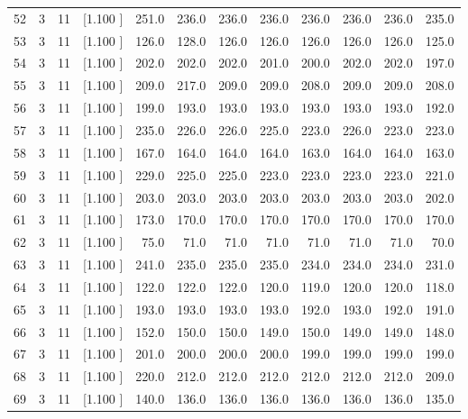 \documentclass[12pt,a4paper]{article}
\begin{document}
\begin{center}
{\begin{tabular}{r r r r r r r r r r r r}
  52&  3& 11&[1.100     ]&   251.0&   236.0&   236.0&   236.0&   236.0&   236.0&   236.0&   235.0\\[-0.02in]
  53&  3& 11&[1.100     ]&   126.0&   128.0&   126.0&   126.0&   126.0&   126.0&   126.0&   125.0\\[-0.02in]
  54&  3& 11&[1.100     ]&   202.0&   202.0&   202.0&   201.0&   200.0&   202.0&   202.0&   197.0\\[-0.02in]
  55&  3& 11&[1.100     ]&   209.0&   217.0&   209.0&   209.0&   208.0&   209.0&   209.0&   208.0\\[-0.02in]
  56&  3& 11&[1.100     ]&   199.0&   193.0&   193.0&   193.0&   193.0&   193.0&   193.0&   192.0\\[-0.02in]
  57&  3& 11&[1.100     ]&   235.0&   226.0&   226.0&   225.0&   223.0&   226.0&   223.0&   223.0\\[-0.02in]
  58&  3& 11&[1.100     ]&   167.0&   164.0&   164.0&   164.0&   163.0&   164.0&   164.0&   163.0\\[-0.02in]
  59&  3& 11&[1.100     ]&   229.0&   225.0&   225.0&   223.0&   223.0&   223.0&   223.0&   221.0\\[-0.02in]
  60&  3& 11&[1.100     ]&   203.0&   203.0&   203.0&   203.0&   203.0&   203.0&   203.0&   202.0\\[-0.02in]
  61&  3& 11&[1.100     ]&   173.0&   170.0&   170.0&   170.0&   170.0&   170.0&   170.0&   170.0\\[-0.02in]
  62&  3& 11&[1.100     ]&    75.0&    71.0&    71.0&    71.0&    71.0&    71.0&    71.0&    70.0\\[-0.02in]
  63&  3& 11&[1.100     ]&   241.0&   235.0&   235.0&   235.0&   234.0&   234.0&   234.0&   231.0\\[-0.02in]
  64&  3& 11&[1.100     ]&   122.0&   122.0&   122.0&   120.0&   119.0&   120.0&   120.0&   118.0\\[-0.02in]
  65&  3& 11&[1.100     ]&   193.0&   193.0&   193.0&   193.0&   192.0&   193.0&   192.0&   191.0\\[-0.02in]
  66&  3& 11&[1.100     ]&   152.0&   150.0&   150.0&   149.0&   150.0&   149.0&   149.0&   148.0\\[-0.02in]
  67&  3& 11&[1.100     ]&   201.0&   200.0&   200.0&   200.0&   199.0&   199.0&   199.0&   199.0\\[-0.02in]
  68&  3& 11&[1.100     ]&   220.0&   212.0&   212.0&   212.0&   212.0&   212.0&   212.0&   209.0\\[-0.02in]
  69&  3& 11&[1.100     ]&   140.0&   136.0&   136.0&   136.0&   136.0&   136.0&   136.0&   135.0\\[-0.02in]

\end{tabular}}
\end{center}
\end{document}

